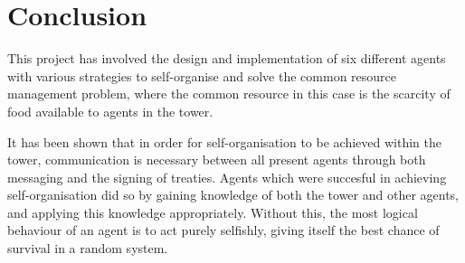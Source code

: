 \chapter{Conclusion}\label{conclusion}

This project has involved the design and implementation of six different agents with various strategies to self-organise and solve the common resource management problem, where the common resource in this case is the scarcity of food available to agents in the tower.

It has been shown that in order for self-organisation to be achieved within the tower, communication is necessary between all present agents through both messaging and the signing of treaties. Agents which were succesful in achieving self-organisation did so by gaining knowledge of both the tower and other agents, and applying this knowledge appropriately. Without this, the most logical behaviour of an agent is to act purely selfishly, giving itself the best chance of survival in a random system.